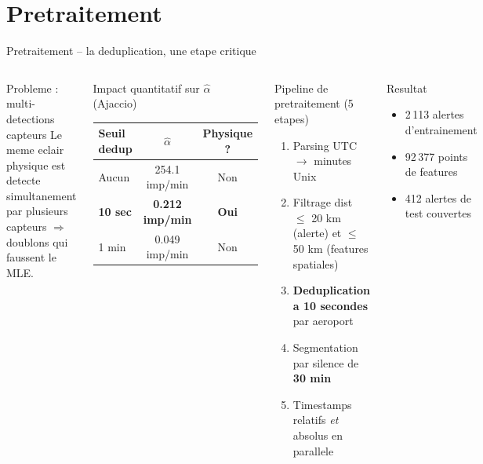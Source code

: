 \documentclass[aspectratio=169, 10pt]{beamer}
\begin{document}
\section{Pretraitement}

\begin{frame}{Pretraitement -- la deduplication, une etape critique}
  \begin{columns}[T]
      \begin{alertblock}{Probleme : multi-detections capteurs}
        Le meme eclair physique est detecte simultanement par plusieurs capteurs
        $\Rightarrow$ doublons qui faussent le MLE.
      \end{alertblock}
      \vspace{0.2cm}
      \begin{block}{Impact quantitatif sur $\hat\alpha$ (Ajaccio)}
        \centering
        \begin{tabular}{lcc}
          \toprule
          Seuil dedup & $\hat\alpha$ & Physique ? \\
          \midrule
          Aucun       & 254.1 imp/min & Non \\
          \textbf{10 sec} & \textbf{0.212 imp/min} & \textbf{Oui} \\
          1 min       &   0.049 imp/min & Non \\
          \bottomrule
        \end{tabular}
      \end{block}

      \begin{block}{Pipeline de pretraitement (5 etapes)}
        \begin{enumerate}
          \item Parsing UTC $\to$ minutes Unix
          \item Filtrage dist $\leq$ 20 km (alerte) et $\leq$ 50 km (features spatiales)
          \item \textbf{Deduplication a 10 secondes} par aeroport
          \item Segmentation par silence de \textbf{30 min}
          \item Timestamps relatifs \emph{et} absolus en parallele
        \end{enumerate}
      \end{block}
      \vspace{0.2cm}
      \begin{exampleblock}{Resultat}
        \begin{itemize}
          \item 2\,113 alertes d'entrainement
          \item 92\,377 points de features
          \item 412 alertes de test couvertes
        \end{itemize}
      \end{exampleblock}
  \end{columns}
\end{frame}
\end{document}
